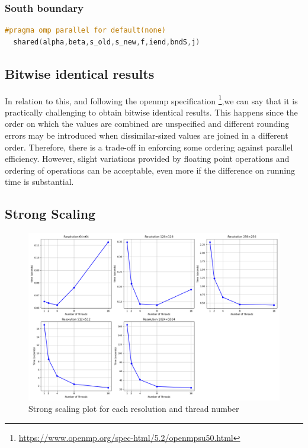 \documentclass[unicode,11pt,a4paper,oneside,numbers=endperiod,openany]{scrartcl}
\begin{document}
\subsubsection{South boundary}
\begin{lstlisting}[language=C]
  #pragma omp parallel for default(none) 
  shared(alpha,beta,s_old,s_new,f,iend,bndS,j)
\end{lstlisting}

\subsection{Bitwise identical results}
In relation to this, and following the openmp specification \footnote{\url{https://www.openmp.org/spec-html/5.2/openmpsu50.html}},we can say that
it is practically challenging to obtain bitwise identical results. This happens since the order on which the values are combined are unspecified and
 different rounding errors may be introduced when dissimilar-sized values are joined in a different order.
Therefore, there is a trade-off in enforcing some ordering against parallel efficiency. However, slight variations provided by floating point operations 
and ordering of operations can be acceptable, even more if the difference on running time is substantial. 

\subsection{Strong Scaling}
\begin{figure}[H]
  \centering
  \includegraphics[width=\textwidth]{./img/exe2/strong_scaling.png}
  \caption{Strong scaling plot for each resolution and thread number}
\end{figure}
\end{document}
